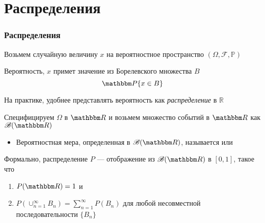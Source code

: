 \section{Распределения}

\begin{frame}\frametitle{Распределения}

    \vspace{2em}
    Возьмем случайную величину $x$ на вероятностное пространство 
    $(\Omega, \mathscr{F}, \mathbb{P})$
    
    Вероятность, $x$ примет значение из Борелевского множества $B$ 
        $$\PP\{x\in B\}$$
    
    \vspace{1em}
    На практике, удобнее представлять вероятность
    как \emph{распределение} в $\mathbb{R}$ 
    
\end{frame}


\begin{frame}

    \vspace{2em}
    Специфицируем $\Omega$ в $\RR$ и возьмем множество 
     событий в $\RR$ как $\mathscr{B}(\RR)$
    
    \begin{itemize}
        \item Вероятностная мера, определенная в $\mathscr{B}(\RR)$,
        называется  или 
    \end{itemize}
    
    \vspace{1em}
    Формально, распределение
    $P$ --- отображение из $\bB(\RR)$ в $[0, 1]$, такое что 
    \begin{enumerate}
            \label{enum:nu}
        \item $P(\RR) = 1$ и
        \item $P(\cup_{n=1}^{\infty} B_n) = \sum_{n=1}^\infty P(B_n)$ 
            для любой несовместной последовательности $\{B_n\}$
    \end{enumerate}
    
\end{frame}

